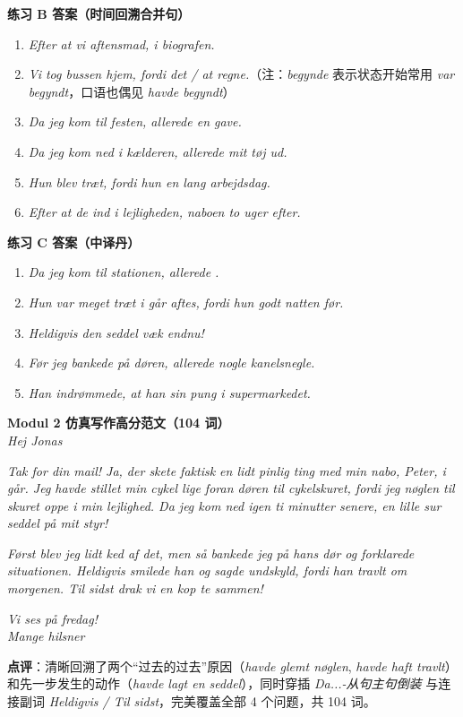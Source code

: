 \begin{answerbox}
\textbf{练习 B 答案（时间回溯合并句）}
\begin{enumerate}
  \item \textit{Efter at vi  aftensmad,  i biografen.}
  \item \textit{Vi tog bussen hjem, fordi det  /  at regne.}（注：\textit{begynde} 表示状态开始常用 \textit{var begyndt}，口语也偶见 \textit{havde begyndt}）
  \item \textit{Da jeg kom til festen,  allerede  en gave.}
  \item \textit{Da jeg kom ned i kælderen,  allerede  mit tøj ud.}
  \item \textit{Hun blev træt, fordi hun  en lang arbejdsdag.}
  \item \textit{Efter at de  ind i lejligheden,  naboen to uger efter.}
\end{enumerate}

\textbf{练习 C 答案（中译丹）}
\begin{enumerate}
  \item \textit{Da jeg kom til stationen,  allerede .}
  \item \textit{Hun var meget træt i går aftes, fordi hun  godt natten før.}
  \item \textit{Heldigvis  den seddel væk endnu!}
  \item \textit{Før jeg bankede på døren,  allerede  nogle kanelsnegle.}
  \item \textit{Han indrømmede, at han  sin pung i supermarkedet.}
\end{enumerate}

\textbf{Modul 2 仿真写作高分范文（104 词）}\\
\textit{Hej Jonas}

\textit{Tak for din mail! Ja, der skete faktisk en lidt pinlig ting med min nabo, Peter, i går. Jeg havde stillet min cykel lige foran døren til cykelskuret, fordi jeg  nøglen til skuret oppe i min lejlighed. Da jeg kom ned igen ti minutter senere,  en lille sur seddel på mit styr!}

\textit{Først blev jeg lidt ked af det, men så bankede jeg på hans dør og forklarede situationen. Heldigvis smilede han og sagde undskyld, fordi han  travlt om morgenen. Til sidst drak vi en kop te sammen!}

\textit{Vi ses på fredag!\\
Mange hilsner\\
}

\small\textbf{点评}：清晰回溯了两个“过去的过去”原因（\textit{havde glemt nøglen}, \textit{havde haft travlt}）和先一步发生的动作（\textit{havde lagt en seddel}），同时穿插 \textit{Da...-从句主句倒装} 与连接副词 \textit{Heldigvis / Til sidst}，完美覆盖全部 4 个问题，共 104 词。
\end{answerbox}

